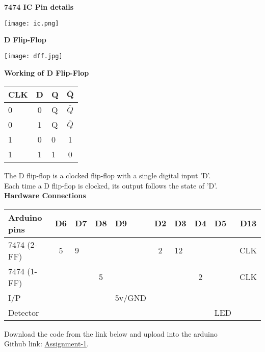 \documentclass[10pt,a4paper]{report}
\begin{document}
\begin{multicols}{2}
   \vspace{2mm}\textbf{7474 IC Pin details}
 \begin{center}
 \texttt{[image: ic.png]} 
 \end{center}\vspace{5mm}
  \vspace{2mm}\textbf{D Flip-Flop}
 \begin{center}
 \texttt{[image: dff.jpg]} 
 \end{center}\vspace{1cm}
 \textbf{Working of D Flip-Flop}

  \setlength{\arrayrulewidth}{0.5mm} \begin{center}
      

  \setlength{\tabcolsep}{25pt}
  \renewcommand{\arraystretch}{1.3}
  \begin{tabular}{|l|c|l|c|}
  \hline 
  \textbf{CLK} & \textbf{D} & \textbf{Q}  & \textbf{$\overline{\textbf{Q}}$}\\
  \hline
    0 & 0 & Q & $\overline{Q}$\\
    0 & 1 & Q & $\overline{Q}$ \\
    1 & 0 & 0 & 1\\
    1 & 1 & 1 & 0\\
    \hline
      \end{tabular}
  \end{center} \vspace{2mm}
  
The D flip-flop is a clocked flip-flop with a single digital input 'D'. \\ Each time a D flip-flop is clocked, its output follows the state of 'D'.\\
\vspace{1cm}
\textbf{Hardware Connections }
\begin{center}
\setlength{\arrayrulewidth}{0.5mm}
\setlength{\tabcolsep}{0.9pt}
\renewcommand{\arraystretch}{2}
    \begin{tabular}{|l|c|l|c|l|c|l|c|l|c|}
    \hline 
    \textbf{Arduino pins} & \textbf{D6} & \textbf{D7} & \textbf{D8} & \textbf{ D9} & \textbf{D2} & \textbf{D3} & \textbf{D4} & \textbf{D5}& \textbf{D13}\\
    \hline
    7474 (2-FF) & 5 & 9 &  &  & 2 & 12 &  &  & CLK \\  \hline
    7474 (1-FF) &  &  & 5 &  &  &  & 2 &  & CLK \\ \hline
    I/P &  &  &   & 5v/GND &  &  &   &    &   \\ \hline
    Detector&  &  &   &  &  &  &   & LED &  \\ 
    \hline
      \end{tabular}
  \end{center}
  
\raggedright  Download the code from the link below and upload into the arduino\\
Github link: \href{https://github.com/chiragshah1244/FWC/blob/main/assignments/assignment-1/code/src/seq.cpp}{Assignment-1}.

  \end{multicols}
\end{document}
